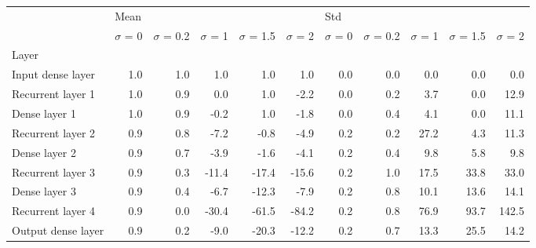\begin{tabular}{lrrrrrrrrrr}
\toprule
{} & \multicolumn{5}{l}{Mean} & \multicolumn{5}{l}{Std} \\
{} & $\sigma$  = 0 & $\sigma$  = 0.2 & $\sigma$  = 1 & $\sigma$  = 1.5 & $\sigma$  = 2 & $\sigma$  = 0 & $\sigma$  = 0.2 & $\sigma$  = 1 & $\sigma$  = 1.5 & $\sigma$  = 2 \\
Layer              &               &                 &               &                 &               &               &                 &               &                 &               \\
\midrule
Input dense layer  &           1.0 &             1.0 &           1.0 &             1.0 &           1.0 &           0.0 &             0.0 &           0.0 &             0.0 &           0.0 \\
Recurrent layer 1  &           1.0 &             0.9 &           0.0 &             1.0 &          -2.2 &           0.0 &             0.2 &           3.7 &             0.0 &          12.9 \\
Dense layer 1      &           1.0 &             0.9 &          -0.2 &             1.0 &          -1.8 &           0.0 &             0.4 &           4.1 &             0.0 &          11.1 \\
Recurrent layer 2  &           0.9 &             0.8 &          -7.2 &            -0.8 &          -4.9 &           0.2 &             0.2 &          27.2 &             4.3 &          11.3 \\
Dense layer 2      &           0.9 &             0.7 &          -3.9 &            -1.6 &          -4.1 &           0.2 &             0.4 &           9.8 &             5.8 &           9.8 \\
Recurrent layer 3  &           0.9 &             0.3 &         -11.4 &           -17.4 &         -15.6 &           0.2 &             1.0 &          17.5 &            33.8 &          33.0 \\
Dense layer 3      &           0.9 &             0.4 &          -6.7 &           -12.3 &          -7.9 &           0.2 &             0.8 &          10.1 &            13.6 &          14.1 \\
Recurrent layer 4  &           0.9 &             0.0 &         -30.4 &           -61.5 &         -84.2 &           0.2 &             0.8 &          76.9 &            93.7 &         142.5 \\
Output dense layer &           0.9 &             0.2 &          -9.0 &           -20.3 &         -12.2 &           0.2 &             0.7 &          13.3 &            25.5 &          14.2 \\
\bottomrule
\end{tabular}
